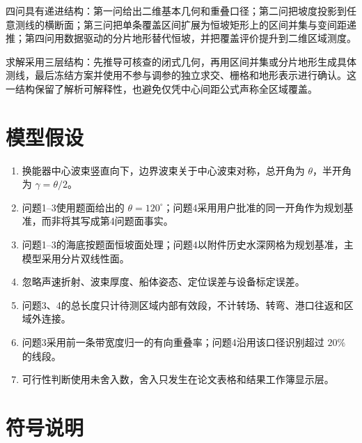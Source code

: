 \documentclass[UTF8,a4paper,12pt]{ctexart}
\newcommand{\degree}{^\circ}
\begin{document}
四问具有递进结构：第一问给出二维基本几何和重叠口径；第二问把坡度投影到任意测线的横断面；第三问把单条覆盖区间扩展为恒坡矩形上的区间并集与变间距递推；第四问用数据驱动的分片地形替代恒坡，并把覆盖评价提升到二维区域测度。

求解采用三层结构：先推导可核查的闭式几何，再用区间并集或分片地形生成具体测线，最后冻结方案并使用不参与调参的独立求交、栅格和地形表示进行确认。这一结构保留了解析可解释性，也避免仅凭中心间距公式声称全区域覆盖。

\section{模型假设}

\begin{enumerate}[leftmargin=2.6em]
  \item 换能器中心波束竖直向下，边界波束关于中心波束对称，总开角为 $\theta$，半开角为 $\gamma=\theta/2$。
  \item 问题1--3使用题面给出的 $\theta=120\degree$；问题4采用用户批准的同一开角作为规划基准，而非将其写成第4问题面事实。
  \item 问题1--3的海底按题面恒坡面处理；问题4以附件历史水深网格为规划基准，主模型采用分片双线性面。
  \item 忽略声速折射、波束厚度、船体姿态、定位误差与设备标定误差。
  \item 问题3、4的总长度只计待测区域内部有效段，不计转场、转弯、港口往返和区域外连接。
  \item 问题3采用前一条带宽度归一的有向重叠率；问题4沿用该口径识别超过 $20\%$ 的线段。
  \item 可行性判断使用未舍入数，舍入只发生在论文表格和结果工作簿显示层。
\end{enumerate}

\section{符号说明}
\end{document}
